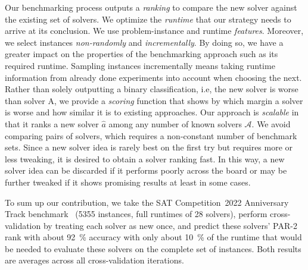 \documentclass[runningheads]{llncs}
\begin{document}
Our benchmarking process outputs a \emph{ranking} to compare the new solver against the existing set of solvers.
We optimize the \emph{runtime} that our strategy needs to arrive at its conclusion.
We use problem-instance and runtime \emph{features}.
Moreover, we select instances \emph{non-randomly} and \emph{incrementally}.
By doing so, we have a greater impact on the properties of the benchmarking approach such as its required runtime.
Sampling instances incrementally means taking runtime information from already done experiments into account when choosing the next.
Rather than solely outputting a binary classification, i.e, the new solver is worse than solver A, we provide a \emph{scoring} function that shows by which margin a solver is worse and how similar it is to existing approaches.
Our approach is \emph{scalable} in that it ranks a new solver $\hat{a}$ among any number of known solvers $\mathcal{A}$.
We avoid comparing pairs of solvers, which requires a non-constant number of benchmark sets.
Since a new solver idea is rarely best on the first try but requires more or less tweaking, it is desired to obtain a solver ranking fast.
In this way, a new solver idea can be discarded if it performs poorly across the board or may be further tweaked if it shows promising results at least in some cases.

To sum up our contribution, we take the SAT Competition~2022 Anniversary Track benchmark~\cite{sat2022} (5355 instances, full runtimes of 28 solvers), perform cross-validation by treating each solver as new once, and predict these solvers' PAR-2 rank with about \SI{92}{\%} accuracy with only about \SI{10}{\%} of the runtime that would be needed to evaluate these solvers on the complete set of instances.
Both results are averages across all cross-validation iterations.
\end{document}
